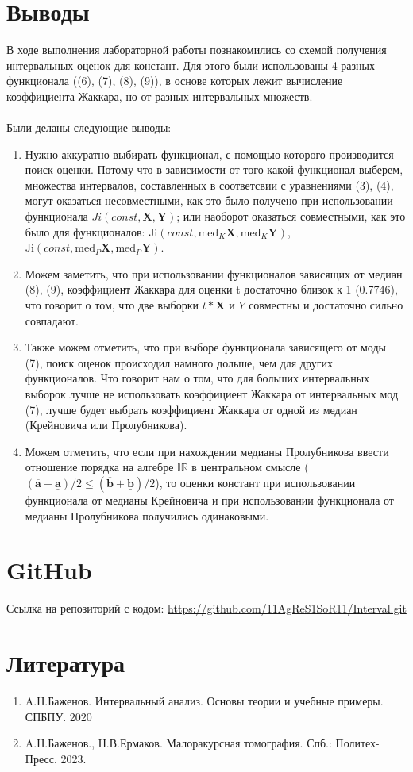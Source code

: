 \documentclass[a4paper,12pt]{article}
\begin{document}
\newpage
\section{Выводы}
В ходе выполнения лабораторной работы познакомились со схемой получения интервальных оценок для констант. Для этого были использованы 4 разных функционала ((6), (7), (8), (9)), в основе которых лежит вычисление коэффициента Жаккара, но от разных интервальных множеств.\\
\\
Были деланы следующие выводы:
\begin{enumerate}
    \item Нужно аккуратно выбирать функционал, с помощью которого производится поиск оценки. Потому что в зависимости от того какой функционал выберем, множества интервалов, составленных в соответсвии с уравнениями (3), (4), могут оказаться несовместными, как это было получено при использовании функционала $Ji(const,\mathbf{X},\mathbf{Y})$; или наоборот оказаться совместными, как это было для функционалов: $\text{Ji} (const, \text{med}_K \mathbf{X}, \text{med}_K \mathbf{Y})$, $\text{Ji} (const, \text{med}_P \mathbf{X}, \text{med}_P \mathbf{Y})$.
    \item Можем заметить, что при использовании функционалов зависящих от медиан (8), (9), коэффициент Жаккара для оценки t достаточно близок к 1 (0.7746), что говорит о том, что две выборки $t*\mathbf{X}$ и $Y$ совместны и достаточно сильно совпадают.
    \item Также можем отметить, что при выборе функционала зависящего от моды (7), поиск оценок происходил намного дольше, чем для других функционалов. Что говорит нам о том, что для больших интервальных выборок лучше не использовать коэффициент Жаккара от интервальных мод (7), лучше будет выбрать коэффициент Жаккара от одной из медиан (Крейновича или Пролубникова).
    \item Можем отметить, что если при нахождении медианы Пролубникова ввести отношение порядка на алгебре \( \mathbb{IR} \) в центральном смысле (\( (\overline{\mathbf{a}} + \underline{\mathbf{a}}) / 2 \leq (\overline{\mathbf{b}} + \underline{\mathbf{b}}) / 2 \)), то оценки констант при использовании функционала от медианы Крейновича и при использовании функционала от медианы Пролубникова получились одинаковыми.
    
\end{enumerate}

\section{GitHub}
Ссылка на репозиторий с кодом: \url{https://github.com/11AgReS1SoR11/Interval.git} \\

\section{Литература}
\begin{enumerate}
    \item A.Н.Баженов. Интервальный анализ. Основы теории и учебные примеры. СПБПУ. 2020
    \item A.Н.Баженов., Н.В.Ермаков. Малоракурсная томография. Спб.: Политех-Пресс. 2023.  
\end{enumerate}
\end{document}
